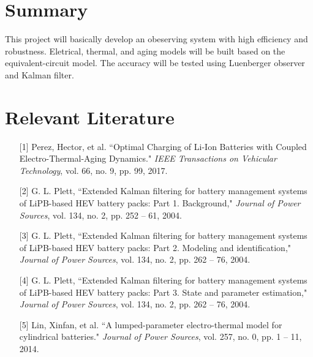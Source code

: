 \documentclass[12pt]{article}
\begin{document}
\section{Summary}
This project will basically develop an obeserving system with high efficiency and robustness. Eletrical, thermal, and aging models will be built based on the equivalent-circuit model. The accuracy will be tested using Luenberger observer and Kalman filter.
\section*{Relevant Literature}
\begin{itemize}[noitemsep, topsep=0pt]
	\item[{[1]}] Perez, Hector, et al. ``Optimal Charging of Li-Ion Batteries with Coupled Electro-Thermal-Aging Dynamics." \textit{IEEE Transactions on Vehicular Technology}, vol. 66, no. 9, pp. 99, 2017.
	\item[{[2]}] G. L. Plett, ``Extended Kalman filtering for battery management systems of LiPB-based HEV battery packs: Part 1. Background," \textit{Journal of Power Sources}, vol. 134, no. 2, pp. 252 – 61, 2004.
	\item[{[3]}] G. L. Plett, ``Extended Kalman filtering for battery management systems of LiPB-based HEV battery packs: Part 2. Modeling and identification," \textit{Journal of Power Sources}, vol. 134, no. 2, pp. 262 – 76, 2004.
	\item[{[4]}] G. L. Plett, ``Extended Kalman filtering for battery management systems of LiPB-based HEV battery packs: Part 3. State and parameter estimation," \textit{Journal of Power Sources}, vol. 134, no. 2, pp. 262 – 76, 2004.
	\item[{[5]}] Lin, Xinfan, et al. ``A lumped-parameter electro-thermal model for cylindrical batteries." \textit{Journal of Power Sources}, vol. 257, no. 0, pp. 1 – 11, 2014.
\end{itemize}
\end{document}

